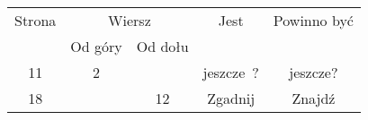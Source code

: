 \documentclass[a4paper,11pt]{article}
\numberwithin{equation}{section}
\begin{document}
\begin{center}

  \begin{tabular}{|c|c|c|c|c|}
    \hline
    Strona & \multicolumn{2}{c|}{Wiersz} & Jest
                              & Powinno być \\ \cline{2-3}
    & Od góry & Od dołu & & \\
    \hline
    11 & \hphantom{0}2 & & jeszcze~? & jeszcze? \\
           18 & & 12 & Zgadnij & Znajdź \\

\end{tabular}
\end{center}
\end{document}
